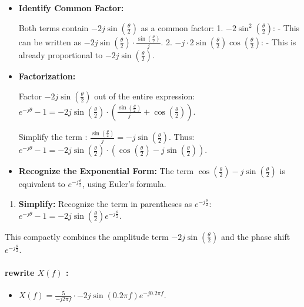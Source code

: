 \documentclass[11pt]{article}
\providecommand{\tightlist}{%
      \setlength{\itemsep}{0pt}\setlength{\parskip}{0pt}}
\begin{document}
\begin{itemize}
\item
  \textbf{Identify Common Factor:}

  Both terms contain \(-2j\sin\left(\frac{\theta}{2}\right)\) as a
  common factor: 1. \(-2\sin^2\left(\frac{\theta}{2}\right)\): - This
  can be written as
  \(-2j\sin\left(\frac{\theta}{2}\right) \cdot \frac{\sin\left(\frac{\theta}{2}\right)}{j}\).
  2.
  \(-j \cdot 2\sin\left(\frac{\theta}{2}\right)\cos\left(\frac{\theta}{2}\right)\):
  - This is already proportional to
  \(-2j\sin\left(\frac{\theta}{2}\right)\).
\item
  \textbf{Factorization:}

  Factor \(-2j\sin\left(\frac{\theta}{2}\right)\) out of the entire
  expression:
  \(e^{-j\theta} - 1 = -2j\sin\left(\frac{\theta}{2}\right) \cdot \left(\frac{\sin\left(\frac{\theta}{2}\right)}{j} + \cos\left(\frac{\theta}{2}\right)\right).\)

  Simplify the term :
  \(\frac{\sin\left(\frac{\theta}{2}\right)}{j} = -j\sin\left(\frac{\theta}{2}\right).\)
  Thus:
  \(e^{-j\theta} - 1 = -2j\sin\left(\frac{\theta}{2}\right) \cdot \left(\cos\left(\frac{\theta}{2}\right) - j\sin\left(\frac{\theta}{2}\right)\right).\)
\item
  \textbf{Recognize the Exponential Form:} The term
  \(\cos\left(\frac{\theta}{2}\right) - j\sin\left(\frac{\theta}{2}\right)\)
  is equivalent to \(e^{-j\frac{\theta}{2}}\), using Euler's formula.
\end{itemize}

\begin{enumerate}
\def\labelenumi{\arabic{enumi}.}
\setcounter{enumi}{4}
\tightlist
\item
  \textbf{Simplify:} Recognize the term in parentheses as
  \(e^{-j\frac{\theta}{2}}\):
  \(e^{-j\theta} - 1 = -2j \sin\left(\frac{\theta}{2}\right) e^{-j\frac{\theta}{2}}.\)
\end{enumerate}

This compactly combines the amplitude term
\(-2j \sin\left(\frac{\theta}{2}\right)\) and the phase shift
\(e^{-j\frac{\theta}{2}}\).

\paragraph{\texorpdfstring{\textbf{rewrite \(X(f)\)}
:}{rewrite X(f) :}}\label{rewrite-xf}

\begin{itemize}
\tightlist
\item
  \(X(f) = \frac{5}{-j 2 \pi f} \cdot -2j \sin(0.2 \pi f) e^{-j 0.2 \pi f}.\)
\end{itemize}
\end{document}

